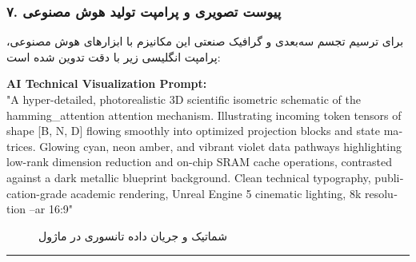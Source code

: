 \subsubsection*{۷. پیوست تصویری و پرامپت تولید هوش مصنوعی}
برای ترسیم تجسم سه‌بعدی و گرافیک صنعتی این مکانیزم با ابزارهای هوش مصنوعی، پرامپت انگلیسی زیر با دقت تدوین شده است:

\vspace{0.2cm}
\begin{latin}
\footnotesize
\textbf{AI Technical Visualization Prompt:}\\
"A hyper-detailed, photorealistic 3D scientific isometric schematic of the hamming\_attention attention mechanism. Illustrating incoming token tensors of shape [B, N, D] flowing smoothly into optimized projection blocks and state matrices. Glowing cyan, neon amber, and vibrant violet data pathways highlighting low-rank dimension reduction and on-chip SRAM cache operations, contrasted against a dark metallic blueprint background. Clean technical typography, publication-grade academic rendering, Unreal Engine 5 cinematic lighting, 8k resolution --ar 16:9"
\end{latin}

\begin{figure}[H]
    \centering
    \caption{شماتیک و جریان داده تانسوری در ماژول }
    \label{fig:hamming_attention}
\end{figure}

\vspace{0.5cm}
\hrule
\vspace{0.5cm}
